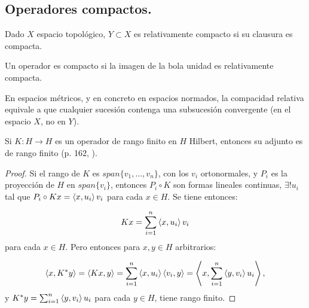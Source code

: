 \subsection{Operadores compactos.}

\begin{definition}
  Dado $X$ espacio topológico, $Y\subset X$ es relativamente compacto si su
  clausura es compacta.
\end{definition}

\begin{definition}
  Un operador es compacto si la imagen de la bola unidad es relativamente
  compacta.
\end{definition}

\begin{remark}
  En espacios métricos, y en concreto en espacios normados, la compacidad
  relativa equivale a que cualquier sucesión contenga una subsucesión
  convergente (en el espacio $X$, no en $Y$).
\end{remark}

\begin{lemma}
  \label{le:finite-range-adjoint}
  Si $K:H\to H$ es un operador de rango finito en $H$ Hilbert, entonces su
  adjunto es de rango finito (p. 162, \cite{cascales2012}).
\end{lemma}
\begin{proof}
  Si el rango de $K$ es $span\{v_1,\ldots,v_n\}$, con los $v_i$ ortonormales, y
  $P_i$ es la proyección de $H$ en $span \{v_i\}$, entonces $P_i\circ K$ son
  formas lineales continuas, $\exists ! u_i$ tal que $P_i\circ K x =
  \left\langle x,u_i\right\rangle v_i$ para cada $x\in H$. Se tiene entonces:

   \[
  Kx = \sum_{i=1}^{n} \left\langle x,u_i\right\rangle v_i
  \] 
  para cada $x\in H$. Pero entonces para $x,y\in H$ arbitrarios:

  \[
  \left\langle x,K^*y\right\rangle=\left\langle Kx,y\right\rangle=\sum_{i=1}^{n} \left\langle x,u_i\right\rangle\left\langle v_i,y\right\rangle=
  \left\langle x,\sum_{i=1}^{n} \left\langle y,v_i\right\rangle u_i\right\rangle
  ,\] 
  y $K^*y=\sum_{i=1}^{n} \left\langle y,v_i\right\rangle u_i$ para cada $y\in H$, tiene rango
  finito.
\end{proof}

